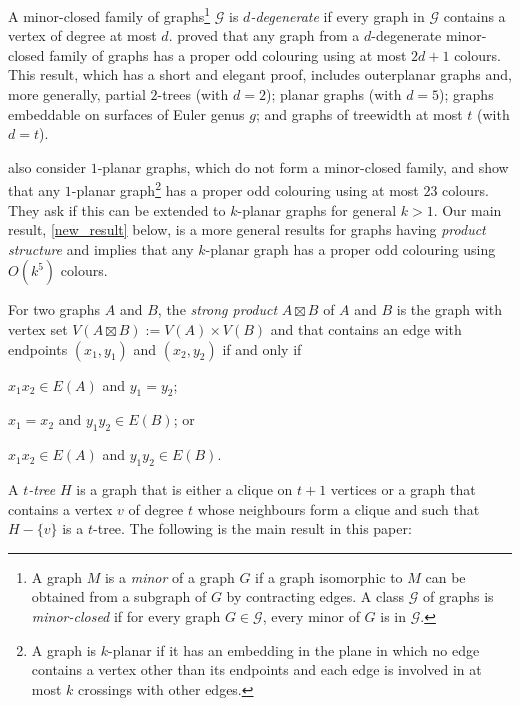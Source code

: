 \documentclass{patmorin}
\begin{document}
A minor-closed family of graphs\footnote{A graph $M$ is a \textit{minor} of a graph $G$ if a graph isomorphic to $M$ can be obtained from a subgraph of $G$ by contracting edges. A class $\mathcal{G}$ of graphs is \emph{minor-closed} if for every graph $G\in\mathcal{G}$, every minor of $G$ is in $\mathcal{G}$.} $\mathcal{G}$ is \emph{$d$-degenerate} if every graph in $\mathcal{G}$ contains a vertex of degree at most $d$.
\citet{cranston.lafferty.ea:note} proved that any graph from a $d$-degenerate minor-closed family of graphs has a proper odd colouring using at most $2d+1$ colours.  This result, which has a short and elegant proof, includes outerplanar graphs and, more generally, partial $2$-trees (with $d=2$); planar graphs (with $d=5$); graphs embeddable on surfaces of Euler genus $g$; and graphs of treewidth at most $t$ (with $d=t$).

\citet{cranston.lafferty.ea:note} also consider $1$-planar graphs, which do not form a minor-closed family, and show that any $1$-planar graph\footnote{A graph is $k$-planar if it has an embedding in the plane in which no edge contains a vertex other than its endpoints and each edge is involved in at most $k$ crossings with other edges.} has a proper odd colouring using at most $23$ colours.  They ask if this can be extended to $k$-planar graphs for general $k>1$.  Our main result, \cref{new_result} below, is a more general results for graphs having \emph{product structure} and implies that any $k$-planar graph has a proper odd colouring using $O(k^5)$ colours.
%

For two graphs $A$ and $B$, the \emph{strong product} $A\boxtimes B$ of $A$ and $B$ is the graph with vertex set $V(A\boxtimes B):=V(A)\times V(B)$ and that contains an edge with endpoints $(x_1,y_1)$ and $(x_2,y_2)$ if and only if
\begin{inparaenum}[(i)]
  \item $x_1x_2\in E(A)$ and $y_1=y_2$;
  \item $x_1=x_2$ and $y_1y_2\in E(B)$; or
  \item $x_1x_2\in E(A)$ and $y_1y_2\in E(B)$.
\end{inparaenum}
A \emph{$t$-tree} $H$ is a graph that is either a clique on $t+1$ vertices or a graph that contains a vertex $v$ of degree $t$ whose neighbours form a clique and such that $H-\{v\}$ is a $t$-tree.  The following is the main result in this paper:
\end{document}
